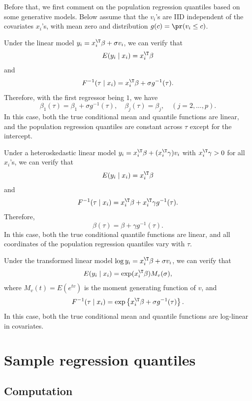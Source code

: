  
Before that, we first comment
on the population regression quantiles based on some generative models. Below assume that the $v_{i}$'s are IID independent of the covariates $x_i$'s, with mean zero and distribution $g(c) = \pr(  v_i \leq c)$. 



\begin{example}
Under the linear model $y_{i}=x_{i}^{\T}\beta+\sigma v_{i}$, we can verify that 
$$
E(y_i\mid x_i) = x_{i}^{\T}\beta
$$
and
\[
F^{-1}(\tau\mid x_{i})=x_{i}^{\T}\beta+\sigma g^{-1}(\tau).
\]
Therefore, with the first regressor being $1$, we have
\[
\beta_{1}(\tau)=\beta_{1}+\sigma g^{-1}(\tau),\quad\beta_{j}(\tau)=\beta_{j},\quad(j=2,\ldots,p).
\]
In this case, both the true conditional mean and quantile functions are linear, and
the population regression quantiles are constant across $\tau$ except
for the intercept.
\end{example}




\begin{example}
Under a heteroskedastic linear model $y_{i}=x_{i}^{\T}\beta+(x_{i}^{\T}\gamma)v_{i}$
with   $x_{i}^{\T}\gamma>0$ for all $x_{i}$'s,
we can verify that 
$$
E(y_i\mid x_i) = x_{i}^{\T}\beta
$$
and 
\[
F^{-1}(\tau\mid x_{i})=x_{i}^{\T}\beta+x_{i}^{\T}\gamma g^{-1}(\tau).
\]
Therefore, 
\[
\beta(\tau)=\beta+\gamma g^{-1}(\tau).
\]
In this case, both the true conditional quantile functions are linear, and
all coordinates of the population regression quantiles vary with $\tau$. 
\end{example}



\begin{example}
Under the transformed linear model $\log y_{i}=x_{i}^{\T}\beta+\sigma v_{i}$, we can verify that 
$$
E(y_i\mid x_i) = \exp(x_{i}^{\T}\beta) M_v(\sigma),
$$
where $M_v(t) = E(e^{tv})$ is the moment generating function of $v$, 
and 
\[
F^{-1}(\tau\mid x_{i})=\exp\left\{ x_{i}^{\T}\beta+\sigma g^{-1}(\tau)\right\} .
\]
In this case, both the true conditional mean and quantile functions are log-linear in covariates. 
\end{example}
   

\section{Sample regression quantiles}

\subsection{Computation}

